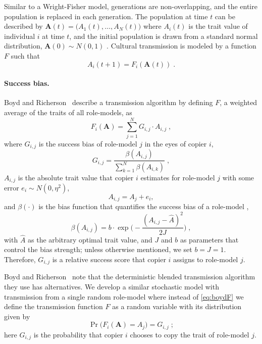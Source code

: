 \documentclass[12pt]{extarticle}
\let\vec\mathbf
\begin{document}
Similar to a Wright-Fisher model, generations are non-overlapping, and the entire population is replaced in each generation.
The population at time $t$ can be described by $\vec{A}(t)=\big(A_{1}(t), \ldots, A_{N}(t)\big)$ where $A_{i}(t)$ is the trait value of individual $i$ at time $t$, and  the initial population is drawn from a standard normal distribution, $\vec{A}(0) \sim N(0,1)$ .
Cultural transmission is modeled by a function $F$ such that 
\begin{equation}\label{eq:transmission}
A_{i}(t+1) = F_i(\vec{A}(t)) \;.
\end{equation}

\paragraph{Success bias.}
Boyd and Richerson~\citep[Ch.~8, p.~247-249]{evolutionBook} describe a  transmission algorithm by defining $F$, a weighted average of the traits of all role-models, as
\begin{equation}\label{eq:boydF}
F_i(\vec{A}) = \sum_{j=1}^N G_{i,j}\cdot A_{i,j} \;, 
\end{equation}
where $G_{i,j}$ is the success bias of role-model $j$ in the eyes of copier $i$,
\begin{equation}\label{eq:boydG}
G_{i,j} = \frac{\beta(A_{i,j})}{\sum_{k=1}^{N} \beta(A_{i,k})} \;,
\end{equation}
$A_{i,j}$ is the absolute trait value that copier $i$ estimates for role-model $j$ with some error $e_i \sim N(0,\eta^2)$,
\begin{equation}\label{eq:relativeTrait}
A_{i,j} = A_j + e_i,
\end{equation}
and $\beta(\cdot)$ is the bias function that quantifies the success bias of a role-model \citep[eq.~5.11]{evolutionBook},
\begin{equation}\label{eq:success_bias}
\beta(A_{i,j}) = b \cdot \exp{\Big(-\frac{(A_{i,j} - \hat{A})^2}{2J}\Big)} \;,
\end{equation} 
with $\hat{A}$ as the arbitrary optimal trait value, and $J$ and $b$ as parameters that control the bias strength; unless otherwise mentioned, we set $b=J=1$.
Therefore, $G_{i,j}$ is a relative success score that copier $i$ assigns to role-model $j$.

Boyd and Richerson~\citep{evolutionBook} note that the deterministic blended transmission algorithm they use has alternatives. We develop a similar stochastic model with transmission from a single random role-model where instead of \cref{eq:boydF} we define the transmission function $F$ as a random variable with its distribution given by 
\begin{equation}\label{eq:ourF}
\Pr\big(F_i(\vec{A}) = A_{j}\big) = G_{i,j} \;;
\end{equation}
{here $G_{i,j}$ is} the probability {that copier $i$ chooses} to copy the trait of role-model $j$.
\end{document}
